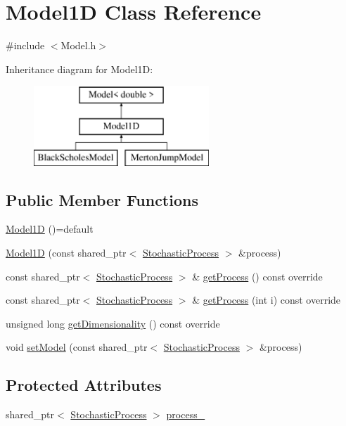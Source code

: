 \hypertarget{class_model1_d}{}\section{Model1D Class Reference}
\label{class_model1_d}


{\ttfamily \#include $<$Model.\+h$>$}

Inheritance diagram for Model1D\+:\begin{figure}[H]
\begin{center}
\leavevmode
\includegraphics[height=3.000000cm]{class_model1_d}
\end{center}
\end{figure}
\subsection*{Public Member Functions}
\begin{DoxyCompactItemize}
\item 
\hyperlink{class_model1_d_a4a4fa285bc474bd52d8a9bc1bc4f2dbf}{Model1D} ()=default
\item 
\hyperlink{class_model1_d_a0dcf861b2408b4254fb0176ef99e320c}{Model1D} (const shared\+\_\+ptr$<$ \hyperlink{class_stochastic_process}{Stochastic\+Process} $>$ \&process)
\item 
const shared\+\_\+ptr$<$ \hyperlink{class_stochastic_process}{Stochastic\+Process} $>$ \& \hyperlink{class_model1_d_a670fd7ee0b66d5d865e0d13d6e50bb40}{get\+Process} () const override
\item 
const shared\+\_\+ptr$<$ \hyperlink{class_stochastic_process}{Stochastic\+Process} $>$ \& \hyperlink{class_model1_d_af7ff938fd134829e876c41fc8be8c24f}{get\+Process} (int i) const override
\item 
unsigned long \hyperlink{class_model1_d_ac81875523be6153cb58d0f37914eb9a1}{get\+Dimensionality} () const override
\item 
void \hyperlink{class_model1_d_ab6c3618666b21f261898597e6e416495}{set\+Model} (const shared\+\_\+ptr$<$ \hyperlink{class_stochastic_process}{Stochastic\+Process} $>$ \&process)
\end{DoxyCompactItemize}
\subsection*{Protected Attributes}
\begin{DoxyCompactItemize}
\item 
shared\+\_\+ptr$<$ \hyperlink{class_stochastic_process}{Stochastic\+Process} $>$ \hyperlink{class_model1_d_af3ea570fe242020bab49cc9530c6bd98}{process\+\_\+}
\end{DoxyCompactItemize}


